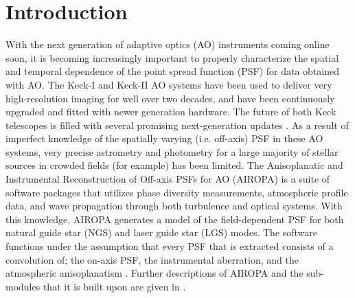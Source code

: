 \documentclass[]{spie}  %
\begin{document}
\section{Introduction} \label{sec:intro}
With the next generation of adaptive optics (AO) instruments coming online soon, it is becoming increasingly important to properly characterize the spatial and temporal dependence of the point spread function (PSF) for data obtained with AO. The Keck-I and Keck-II AO systems have been used to deliver very high-resolution imaging for well over two decades, and have been continuously upgraded and fitted with newer generation hardware. The future of both Keck telescopes is filled with several promising next-generation updates \citep{wizinowich:2020a, bond:2020a}. 
As a result of imperfect knowledge of the spatially varying (i.e. off-axis) PSF in these AO systems, very precise astrometry and photometry for a large majority of stellar sources in crowded fields (for example) has been limited. The Anisoplanatic and Instrumental Reconstruction of Off-axis PSFs for AO (AIROPA) is a suite of software packages that utilizes phase diversity measurements, atmospheric profile data, and wave propagation through both turbulence and optical systems. With this knowledge, AIROPA generates a model of the field-dependent PSF for both natural guide star (NGS) and laser guide star (LGS) modes. The software functions under the assumption that every PSF that is extracted consists of a convolution of; the on-axis PSF, the instrumental aberration, and the atmospheric anisoplanatism \cite{do:2018a}. Further descriptions of AIROPA and the sub-modules that it is built upon are given in \cite{witzel:2016a}.
\end{document}
